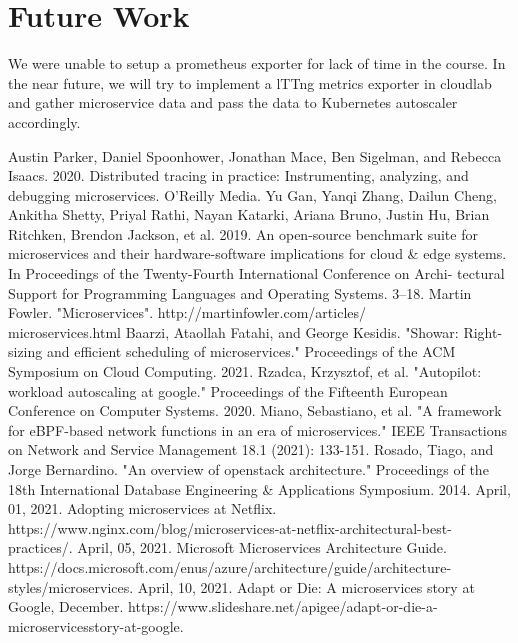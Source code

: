 \documentclass[conference]{IEEEtran}
\begin{document}
\section{Future Work}

We were unable to setup a prometheus exporter for lack of time in the course. In the near future, we will try to implement a lTTng metrics exporter in cloudlab and gather microservice data and pass the data to Kubernetes autoscaler accordingly. 


\begin{thebibliography}{00}
     Austin Parker, Daniel Spoonhower, Jonathan Mace, Ben Sigelman, and Rebecca Isaacs. 2020. Distributed tracing in practice: Instrumenting, analyzing, and debugging microservices. O’Reilly Media.
     Yu Gan, Yanqi Zhang, Dailun Cheng, Ankitha Shetty, Priyal Rathi, Nayan Katarki, Ariana Bruno, Justin Hu, Brian Ritchken, Brendon Jackson, et al. 2019. An open-source benchmark suite for microservices and their hardware-software implications for cloud \& edge systems. In Proceedings of the Twenty-Fourth International Conference on Archi- tectural Support for Programming Languages and Operating Systems. 3–18.
     \sloppy Martin Fowler. "Microservices". http://martinfowler.com/articles/\\microservices.html
     Baarzi, Ataollah Fatahi, and George Kesidis. "Showar: Right-sizing and efficient scheduling of microservices." Proceedings of the ACM Symposium on Cloud Computing. 2021.
     Rzadca, Krzysztof, et al. "Autopilot: workload autoscaling at google." Proceedings of the Fifteenth European Conference on Computer Systems. 2020.
     Miano, Sebastiano, et al. "A framework for eBPF-based network functions in an era of microservices." IEEE Transactions on Network and Service Management 18.1 (2021): 133-151.
     Rosado, Tiago, and Jorge Bernardino. "An overview of openstack architecture." Proceedings of the 18th International Database Engineering \& Applications Symposium. 2014.
     \sloppy April, 01, 2021. Adopting microservices at Netflix. https://www.nginx.com/blog/microservices-at-netflix-architectural-best-practices/.
     \sloppy April, 05, 2021. Microsoft Microservices Architecture Guide. https://docs.microsoft.com/enus/azure/architecture/guide/architecture-styles/microservices.
     \sloppy April, 10, 2021. Adapt or Die: A microservices story at Google, December. https://www.slideshare.net/apigee/adapt-or-die-a-microservicesstory-at-google.

\end{thebibliography}
\end{document}

